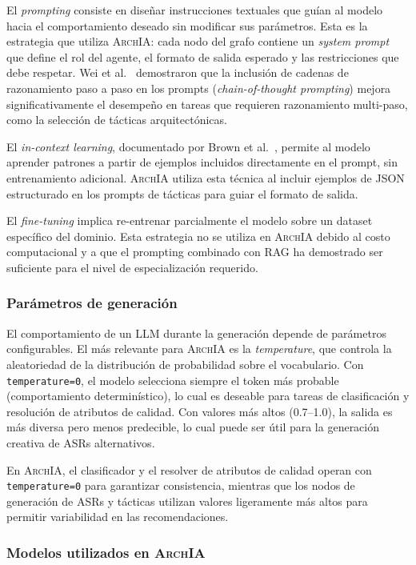 \documentclass[12pt, letterpaper, oneside]{article}
\newcommand{\archia}{\textsc{ArchIA}}
\begin{document}
El \emph{prompting} consiste en diseñar instrucciones textuales que guían al modelo
hacia el comportamiento deseado sin modificar sus parámetros. Esta es la estrategia
que utiliza \archia{}: cada nodo del grafo contiene un \emph{system prompt} que
define el rol del agente, el formato de salida esperado y las restricciones que
debe respetar. Wei et al.~\cite{wei2022chain} demostraron que la inclusión de
cadenas de razonamiento paso a paso en los prompts (\emph{chain-of-thought
prompting}) mejora significativamente el desempeño en tareas que requieren
razonamiento multi-paso, como la selección de tácticas arquitectónicas.

El \emph{in-context learning}, documentado por Brown et al.~\cite{brown2020language},
permite al modelo aprender patrones a partir de ejemplos incluidos directamente en
el prompt, sin entrenamiento adicional. \archia{} utiliza esta técnica al incluir
ejemplos de JSON estructurado en los prompts de tácticas para guiar el formato de
salida.

El \emph{fine-tuning} implica re-entrenar parcialmente el modelo sobre un dataset
específico del dominio. Esta estrategia no se utiliza en \archia{} debido al costo
computacional y a que el prompting combinado con RAG ha demostrado ser suficiente
para el nivel de especialización requerido.

\subsubsection{Parámetros de generación}

El comportamiento de un LLM durante la generación depende de parámetros
configurables. El más relevante para \archia{} es la \emph{temperature}, que
controla la aleatoriedad de la distribución de probabilidad sobre el vocabulario.
Con \texttt{temperature=0}, el modelo selecciona siempre el token más probable
(comportamiento determinístico), lo cual es deseable para tareas de clasificación
y resolución de atributos de calidad. Con valores más altos (0.7--1.0), la salida
es más diversa pero menos predecible, lo cual puede ser útil para la generación
creativa de ASRs alternativos.

En \archia{}, el clasificador y el resolver de atributos de calidad operan con
\texttt{temperature=0} para garantizar consistencia, mientras que los nodos de
generación de ASRs y tácticas utilizan valores ligeramente más altos para
permitir variabilidad en las recomendaciones.

\subsubsection{Modelos utilizados en \archia{}}
\end{document}

